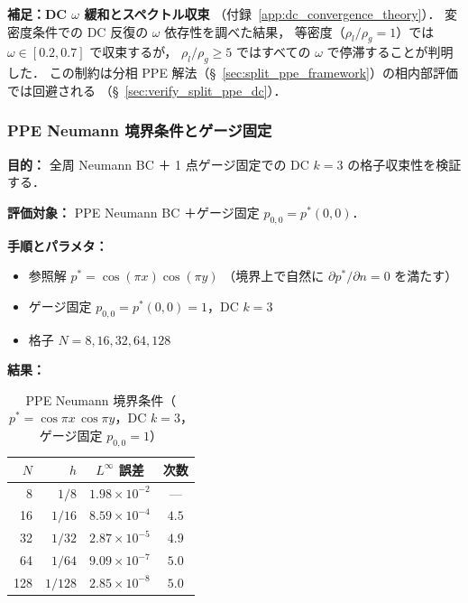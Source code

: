 \noindent\textbf{補足：DC $\omega$ 緩和とスペクトル収束}%
\label{sec:verify_dc_spectral}%
（付録~\ref{app:dc_convergence_theory}）．
変密度条件での DC 反復の $\omega$ 依存性を調べた結果，
等密度（$\rho_l/\rho_g = 1$）では $\omega \in [0.2, 0.7]$ で収束するが，
$\rho_l/\rho_g \geq 5$ ではすべての $\omega$ で停滞することが判明した．
この制約は分相 PPE 解法（§~\ref{sec:split_ppe_framework}）の相内部評価では回避される
（§~\ref{sec:verify_split_ppe_dc}）．


\subsubsection{PPE Neumann 境界条件とゲージ固定}
\label{sec:verify_ppe_neumann}

\noindent\textbf{目的：}
全周 Neumann BC ＋ 1 点ゲージ固定での DC $k{=}3$ の格子収束性を検証する．

\noindent\textbf{評価対象：}
PPE Neumann BC ＋ゲージ固定 $p_{0,0} = p^*(0,0)$．

\noindent\textbf{手順とパラメタ：}
\begin{itemize}[noitemsep]
  \item 参照解 $p^* = \cos(\pi x)\cos(\pi y)$
        （境界上で自然に $\partial p^*/\partial n = 0$ を満たす）
  \item ゲージ固定 $p_{0,0} = p^*(0,0) = 1$，DC $k{=}3$
  \item 格子 $N = 8, 16, 32, 64, 128$
\end{itemize}

\noindent\textbf{結果：}

\begin{table}[htbp]
\centering
\caption{PPE Neumann 境界条件（$p^* = \cos\pi x\,\cos\pi y$，DC $k{=}3$，ゲージ固定 $p_{0,0}=1$）}
\label{tab:ppe_neumann}
\renewcommand{\arraystretch}{1.3}
\begin{tabular}{rr cc}
\toprule
$N$ & $h$ & $L^\infty$ 誤差 & 次数 \\
\midrule
  8 & $1/8$   & $1.98 \times 10^{-2}$ & ---   \\
 16 & $1/16$  & $8.59 \times 10^{-4}$ & $4.5$ \\
 32 & $1/32$  & $2.87 \times 10^{-5}$ & $4.9$ \\
 64 & $1/64$  & $9.09 \times 10^{-7}$ & $5.0$ \\
128 & $1/128$ & $2.85 \times 10^{-8}$ & $5.0$ \\
\bottomrule
\end{tabular}
\end{table}


